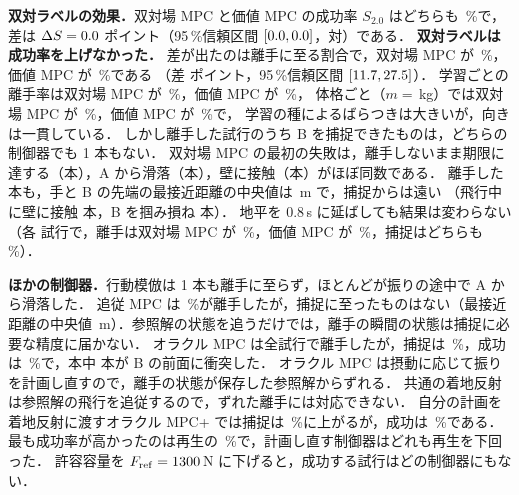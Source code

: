 \textbf{双対ラベルの効果．}双対場 MPC と価値 MPC の成功率 $S_{2.0}$ はどちらも \clSmpcSucc\,\%で，
差は $\Delta S=0.0$ ポイント（95\,\%信頼区間 $[0.0,0.0]$，\deltaSpairs 対）である．
\textbf{双対ラベルは成功率を上げなかった．}
差が出たのは離手に至る割合で，双対場 MPC が \clSmpcRel\,\%，価値 MPC が \clVmpcRel\,\%である
（差 \relDiff ポイント，95\,\%信頼区間 $[11.7,27.5]$）．
学習ごとの離手率は双対場 MPC が \relSmpcSeeds\,\%，価値 MPC が \relVmpcSeeds\,\%，
体格ごと（$m=$\clBodies\,kg）では双対場 MPC が \relSmpcBodies\,\%，価値 MPC が \relVmpcBodies\,\%で，
学習の種によるばらつきは大きいが，向きは一貫している．
しかし離手した試行のうち B を捕捉できたものは，どちらの制御器でも 1 本もない．
双対場 MPC の最初の失敗は，離手しないまま期限に達する（\ffSmpcNoRel 本），A から滑落（\ffSmpcSlip 本），壁に接触（\ffSmpcWall 本）がほぼ同数である．
離手した \relSmpcN 本も，手と B の先端の最接近距離の中央値は \relSmpcDmin\,m で，捕捉からは遠い
（飛行中に壁に接触 \relSmpcWall 本，B を掴み損ね \relSmpcMiss 本）．
地平を 0.8\,s に延ばしても結果は変わらない
（各 \longSmpcN 試行で，離手は双対場 MPC が \longSmpcRel\,\%，価値 MPC が \longVmpcRel\,\%，捕捉はどちらも \longSmpcCatch\,\%）．

\textbf{ほかの制御器．}行動模倣は 1 本も離手に至らず，ほとんどが振りの途中で A から滑落した．
追従 MPC は \clTrackRel\,\%が離手したが，捕捉に至ったものはない（最接近距離の中央値 \relTrackDmin\,m）．参照解の状態を追うだけでは，離手の瞬間の状態は捕捉に必要な精度に届かない．
オラクル MPC は全試行で離手したが，捕捉は \clOracleCatch\,\%，成功は \clOracleSucc\,\%で，\clOracleN 本中 \ffOracleFace 本が B の前面に衝突した．
オラクル MPC は摂動に応じて振りを計画し直すので，離手の状態が保存した参照解からずれる．
共通の着地反射は参照解の飛行を追従するので，ずれた離手には対応できない．
自分の計画を着地反射に渡すオラクル MPC+ では捕捉は \clOraclePlusCatch\,\%に上がるが，成功は \clOraclePlusSucc\,\%である．
最も成功率が高かったのは再生の \clReplaySucc\,\%で，計画し直す制御器はどれも再生を下回った．
許容容量を $F_{\mathrm{ref}}=1300$\,N に下げると，成功する試行はどの制御器にもない．

